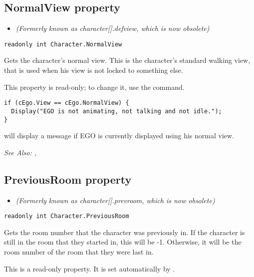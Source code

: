 \subsection{NormalView property}\label{Character.NormalView}%

\begin{itemize}
\item \it{(Formerly known as character[].defview, which is now obsolete)}
\end{itemize}

\begin{verbatim}
readonly int Character.NormalView
\end{verbatim}
Gets the character's normal view. This is the character's standard walking view, that
is used when his view is not locked to something else.

This property is read-only; to change it, use the  command.

\begin{verbatim}
if (cEgo.View == cEgo.NormalView) {
  Display("EGO is not animating, not talking and not idle.");
}
\end{verbatim}
will display a message if EGO is currently displayed using his normal view.

\it{See Also:} ,


\subsection{PreviousRoom property}\label{Character.PreviousRoom}%

\begin{itemize}
\item \it{(Formerly known as character[].prevroom, which is now obsolete)}
\end{itemize}

\begin{verbatim}
readonly int Character.PreviousRoom
\end{verbatim}
Gets the room number that the character was previously in. If the character is still
in the room that they started in, this will be -1. Otherwise, it will be the room number
of the room that they were last in.

This is a read-only property. It is set automatically by .

